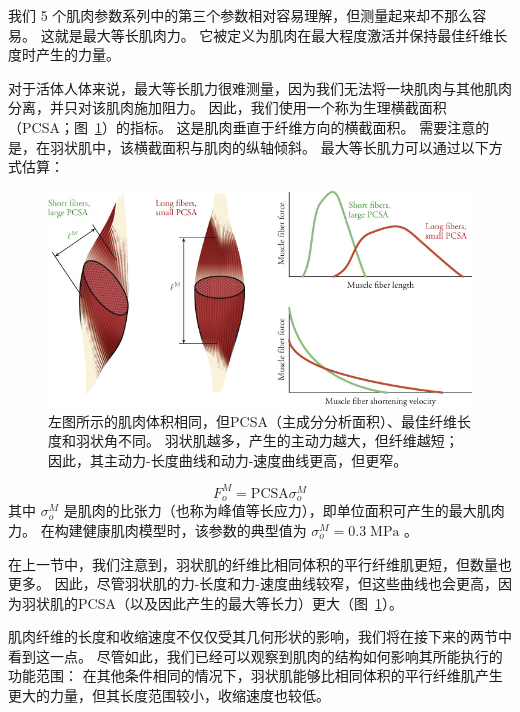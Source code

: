 我们 5 个肌肉参数系列中的第三个参数相对容易理解，但测量起来却不那么容易。
这就是最大等长肌肉力。
它被定义为肌肉在最大程度激活并保持最佳纤维长度时产生的力量。


对于活体人体来说，最大等长肌力很难测量，因为我们无法将一块肌肉与其他肌肉分离，并只对该肌肉施加阻力。
因此，我们使用一个称为生理横截面积（PCSA；图~\ref{fig:5_5}）的指标。
这是肌肉垂直于纤维方向的横截面积。
需要注意的是，在羽状肌中，该横截面积与肌肉的纵轴倾斜。
最大等长肌力可以通过以下方式估算：

\begin{figure}[!htb]
	\centering
	\includegraphics[width=1.0\linewidth]{chap5/5_5}
	\caption{左图所示的肌肉体积相同，但PCSA（主成分分析面积）、最佳纤维长度和羽状角不同。
		羽状肌越多，产生的主动力越大，但纤维越短；
		因此，其主动力-长度曲线和动力-速度曲线更高，但更窄\cite{lieber2002skeletal}。 \label{fig:5_5}}
\end{figure}

\begin{equation}
	F_o^M = \text{PCSA} \sigma_o^M
	\label{eq:5_4}
\end{equation}
%
其中 $\sigma_o^M$ 是肌肉的比张力（也称为峰值等长应力），即单位面积可产生的最大肌肉力。
在构建健康肌肉模型时，该参数的典型值为 $\sigma_o^M = 0.3 \; \text{MPa}$ 。


在上一节中，我们注意到，羽状肌的纤维比相同体积的平行纤维肌更短，但数量也更多。
因此，尽管羽状肌的力-长度和力-速度曲线较窄，但这些曲线也会更高，因为羽状肌的PCSA（以及因此产生的最大等长力）更大（图~\ref{fig:5_5}）。


肌肉纤维的长度和收缩速度不仅仅受其几何形状的影响，我们将在接下来的两节中看到这一点。
尽管如此，我们已经可以观察到肌肉的结构如何影响其所能执行的功能范围：
在其他条件相同的情况下，羽状肌能够比相同体积的平行纤维肌产生更大的力量，但其长度范围较小，收缩速度也较低。



